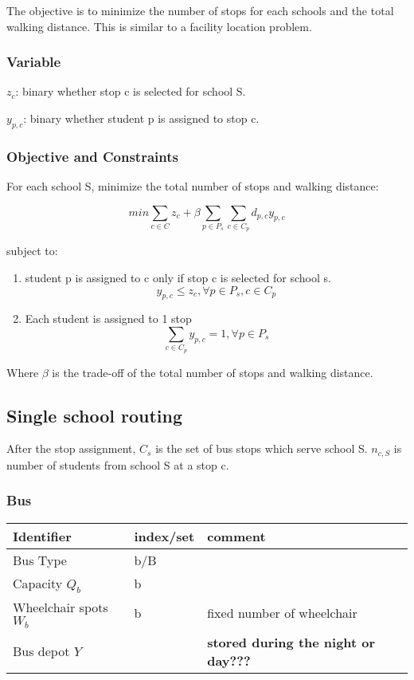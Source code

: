 The objective is to minimize the number of stops for each schools and
the total walking distance. This is similar to a facility location
problem.

\subsubsection{Variable}
\label{variable}
\(z_c\): binary whether stop c is selected for school S.

\(y_{p,c}\): binary whether student p is assigned to stop c. 

\subsubsection{Objective and Constraints}
\label{objective-and-constraints}
For each school S, minimize the total number of stops and walking distance:

$$ min \sum_{c \in C} z_c + \beta \sum_{p \in P_s} \sum_{c \in C_p} d_{p,c} y_{p,c}$$

subject to:

\begin{enumerate}
\item student p is assigned to c only if stop c is selected for school s.
$$y_{p,c} \leq z_c,  \forall p \in P_s , c \in C_p$$

\item Each student is assigned to 1 stop
$$\sum_{c \in C_p} y_{p,c} = 1 ,\forall p \in P_s $$
\end{enumerate}

Where \(\beta\) is the trade-off of the total number of stops and walking
distance.

\subsection{Single school routing}
\label{single-school-routing}
After the stop assignment, \(C_s\) is the set of bus stops which serve
school S.
\(n_{c,S}\) is number of students from school S at a stop c.

\subsubsection{Bus}
\label{bus}
\begin{center}
\begin{tabular}{lll}
Identifier & index/set & comment\\
\hline
Bus Type & b/B & \\
Capacity \(Q_b\) & b & \\
Wheelchair spots \(W_b\) & b & fixed number of wheelchair\\
Bus depot \(Y\) &  & \textbf{stored during the night or day???}\\
\end{tabular}
\end{center}

